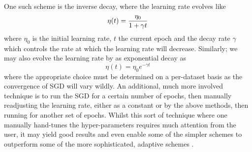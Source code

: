 \documentclass[reprint, english, nofootinbib]{revtex4-2}
\begin{document}
One such scheme is the inverse decay, where the learning rate evolves like
\begin{equation}
    \eta\qty(t) = \frac{\eta_0}{1 + \gamma t}
\end{equation}
where $\eta_0$ is the initial learning rate, $t$ the current epoch and the decay rate $\gamma$ which controls the rate at which the learning rate will decrease. Similarly; we may also evolve the learning rate by as exponential decay as
\begin{equation}
    \eta(t) = \eta_0 e^{-\gamma t}
\end{equation}
where the appropriate choice must be determined on a per-dataset basis as the convergence of SGD will vary wildly. An additional, much more involved technique is to run the SGD for a certain number of epochs, then manually readjusting the learning rate, either as a constant or by the above methods, then running for another set of epochs. Whilst this sort of technique where one manually hand-tunes the hyper-parameters requires much attention from the user, it may yield good results and even enable some of the simpler schemes to outperform some of the more sophisticated, adaptive schemes \cite{zhang2018yellowfin}.
\end{document}
